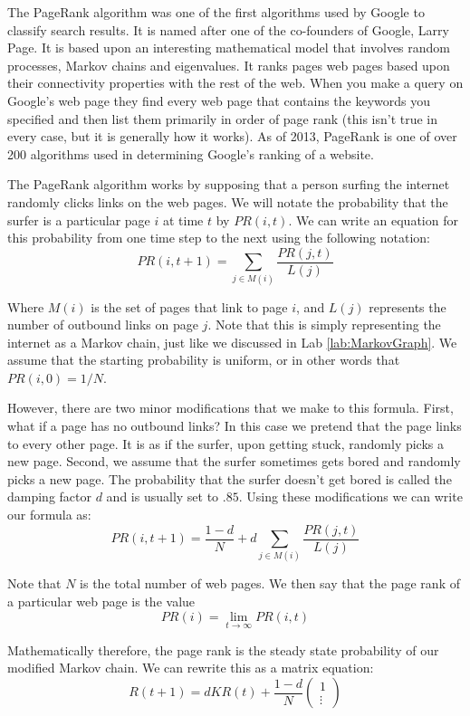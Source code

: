 \label{lab:PageRank}

The PageRank algorithm was one of the first algorithms used by Google to classify search results.  It is named after one of the co-founders of Google, Larry Page.  It is based upon an interesting mathematical model that involves random processes, Markov chains and eigenvalues. It ranks pages web pages based upon their connectivity properties with the rest of the web. When you make a query on Google's web page they find every web page that contains the keywords you specified and then list them primarily in order of page rank (this isn't true in every case, but it is generally how it works).  As of 2013, PageRank is one of over 200 algorithms used in determining Google's ranking of a website.

The PageRank algorithm works by supposing that a person surfing the internet randomly clicks links on the web pages. We will notate the probability that the surfer is a particular page $i$ at time $t$ by $PR(i,t)$. We can write an equation for this probability from one time step to the next using the following notation:
\[
PR(i,t+1) = \sum_{j \in M(i)} \frac{PR(j,t)}{L(j)}
\]

Where $M(i)$ is the set of pages that link to page $i$, and $L(j)$ represents the number of outbound links on page $j$. Note that this is simply representing the internet as a Markov chain, just like we discussed in Lab \ref{lab:MarkovGraph}. We assume that the starting probability is uniform, or in other words that $PR(i,0) = 1/N$.

However, there are two minor modifications that we make to this formula. First, what if a page has no outbound links? In this case we pretend that the page links to every other page.  It is as if the surfer, upon getting stuck, randomly picks a new page. Second, we assume that the surfer sometimes gets bored and randomly picks a new page. The probability that the surfer doesn't get bored is called the damping factor $d$ and is usually set to $.85$. Using these modifications we can write our formula as:
\[
PR(i,t+1) = \frac{1-d}{N} + d\sum_{j \in M(i)} \frac{PR(j,t)}{L(j)}
\]

Note that $N$ is the total number of web pages.
We then say that the page rank of a particular web page is the value
\[PR(i) = \lim_{t\to \infty} PR(i,t)\]

Mathematically therefore, the page rank is the steady state probability of our modified Markov chain.
We can rewrite this as a matrix equation:
\[R(t+1) = d K R(t) + \frac{1-d}{N} \begin{pmatrix}1\\\vdots\end{pmatrix}\]

